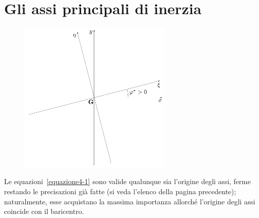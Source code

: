 \section{Gli assi principali di inerzia}
\renewcommand{\thefigure}{4~-~2}
\begin{figure}[ht]
\centering
\includegraphics[width=0.65\textwidth]{Immagini/Parte_4/Figura4_2/Figura4_2.pdf}
\caption{}
\label{figura4-2}
\end{figure}
\noindent Le equazioni~\eqref{equazione4-1} sono valide qualunque sia l'origine degli assi, ferme restando le precisazioni già fatte (si veda l'elenco della pagina precedente); naturalmente, esse acquistano la massima importanza allorché l'origine degli assi coincide con il baricentro. 

